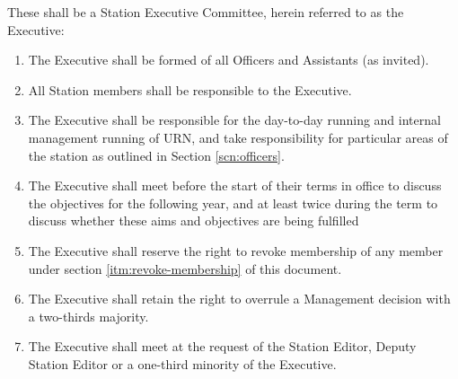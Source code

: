 \item These shall be a Station Executive Committee, herein referred to as the Executive:
\begin{enumerate}[label*=\arabic*.]
    \item The Executive shall be formed of all Officers and Assistants (as invited).
    \item All Station members shall be responsible to the Executive.
    \item The Executive shall be responsible for the day-to-day running and internal management running of URN, and take responsibility for particular areas of the station as outlined in Section \ref{scn:officers}.
    \item The Executive shall meet before the start of their terms in office to discuss the objectives for the following year, and at least twice during the term to discuss whether these aims and objectives are being fulfilled
    \item The Executive shall reserve the right to revoke membership of any member under section \ref{itm:revoke-membership} of this document.
    \item The Executive shall retain the right to overrule a Management decision with a two-thirds majority.
    \item The Executive shall meet at the request of the Station Editor, Deputy Station Editor or a one-third minority of the Executive.
\end{enumerate}
